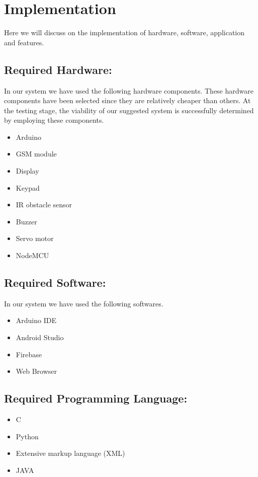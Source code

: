 

\section{Implementation}
Here we will discuss on the implementation of hardware, software, application and features.

\subsection{Required Hardware:}
In our system we have used the following hardware components. These hardware components have been selected since they are relatively cheaper than others. At the testing stage, the viability of our suggested system is successfully determined by employing these components.
\begin{itemize}
    \item Arduino
    \item GSM module
    \item Display
    \item Keypad
    \item IR obstacle sensor
    \item Buzzer
    \item Servo motor
    \item NodeMCU
\end{itemize}
\subsection{Required Software:}
In our system we have used the following softwares.
\begin{itemize}
    \item Arduino IDE
    \item Android Studio
    \item Firebase
    \item Web Browser
\end{itemize}
\subsection{Required Programming Language:}
\begin{itemize}
    \item C
    \item Python
    \item Extensive markup language (XML)
    \item JAVA
\end{itemize}


